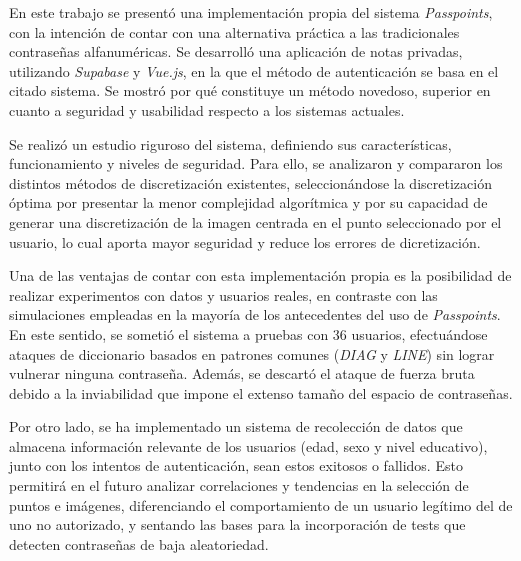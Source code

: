 \begin{conclusions}
En este trabajo se presentó una implementación propia del sistema \textit{Passpoints}, con la intención de contar con una alternativa práctica a las tradicionales contraseñas alfanuméricas. Se desarrolló una aplicación de notas privadas, utilizando \textit{Supabase} y \textit{Vue.js}, en la que el método de autenticación se basa en el citado sistema. Se mostró por qué constituye un método novedoso, superior en cuanto a seguridad y usabilidad respecto a los sistemas actuales.

Se realizó un estudio riguroso del sistema, definiendo sus características, funcionamiento y niveles de seguridad. Para ello, se analizaron y compararon los distintos métodos de discretización existentes, seleccionándose la discretización óptima por presentar la menor complejidad algorítmica y por su capacidad de generar una discretización de la imagen centrada en el punto seleccionado por el usuario, lo cual aporta mayor seguridad y reduce los errores de dicretizaci\'on.

Una de las ventajas de contar con esta implementación propia es la posibilidad de realizar experimentos con datos y usuarios reales, en contraste con las simulaciones empleadas en la mayoría de los antecedentes del uso de \textit{Passpoints}. En este sentido, se sometió el sistema a pruebas con 36 usuarios, efectuándose ataques de diccionario basados en patrones comunes (\textit{DIAG} y \textit{LINE}) sin lograr vulnerar ninguna contraseña. Además, se descartó el ataque de fuerza bruta debido a la inviabilidad que impone el extenso tamaño del espacio de contraseñas.

Por otro lado, se ha implementado un sistema de recolección de datos que almacena información relevante de los usuarios (edad, sexo y nivel educativo), junto con los intentos de autenticación, sean estos exitosos o fallidos. Esto permitirá en el futuro analizar correlaciones y tendencias en la selección de puntos e imágenes, diferenciando el comportamiento de un usuario legítimo del de uno no autorizado, y sentando las bases para la incorporación de tests que detecten contraseñas de baja aleatoriedad.

\end{conclusions}
